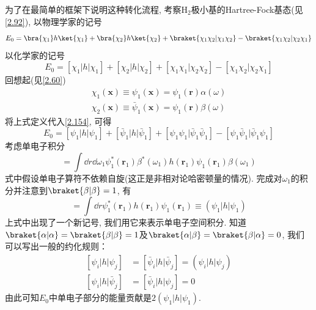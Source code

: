 为了在最简单的框架下说明这种转化流程, 
考察$\mathrm{H}_2$极小基的Hartree-Fock基态(见\autoref{2.92}), 
以物理学家的记号
\begin{equation}
E_0 = \bra{\chi_1}h\ket{\chi_1} + \bra{\chi_2}h\ket{\chi_2} + \braket{\chi_1\chi_2|\chi_1\chi_2} - \braket{\chi_1\chi_2|\chi_2\chi_1}
\end{equation}
以化学家的记号
\begin{equation}
\label{2.154}
E_0 = [{\chi_1|h|\chi_1}] + [{\chi_2|h|\chi_2}] + [{\chi_1\chi_1|\chi_2\chi_2}] - [{\chi_1\chi_2|\chi_2\chi_1}]
\end{equation}
回想起(见\autoref{2.60})
\begin{align}
\chi_1(\mathbf{x})\equiv \psi_1(\mathbf{x}) = \psi_1(\mathbf{\mathbf{r}})\alpha(\omega)\\
\chi_2(\mathbf{x})\equiv \bar{\psi}_1(\mathbf{x}) = \psi_1(\mathbf{\mathbf{r}})\beta(\omega)
\end{align}
将上式定义代入\autoref{2.154}, 
可得
\begin{equation}
\label{2.157}
E_0 = [{\psi_1|h|\psi_1}] + [{\bar{\psi}_1|h|\bar{\psi}_1}] + [{\psi_1\psi_1|\bar{\psi}_1\bar{\psi}_1}] - [{\psi_1\bar{\psi}_1|\bar{\psi}_1\psi_1}]
\end{equation}
考虑单电子积分
\begin{equation}
[\bar{\psi}_1|h|\bar{\psi}_1] = \int\dd{r}\dd\omega_1\psi_1^*(\mathbf{r}_1)\beta^*(\omega_1)h(\mathbf{r}_1)\psi_1(\mathbf{r}_1)\beta(\omega_1)
\end{equation}
式中假设单电子算符不依赖自旋(这正是非相对论哈密顿量的情况). 
完成对$\omega_1$的积分并注意到$\braket{\beta|\beta}=1$, 
有
\begin{equation}
[\bar{\psi}_1|h|\bar{\psi}_1] =\int\dd{r}\psi_1^*(\mathbf{r}_1)h(\mathbf{r}_1)\psi_1(\mathbf{r}_1) \equiv (\psi_1|h|\psi_1)
\end{equation}
上式中出现了一个新记号, 
我们用它来表示单电子空间积分. 
知道$\braket{\alpha|\alpha}=\braket{\beta|\beta}=1$及$\braket{\alpha|\beta}=\braket{\beta|\alpha}=0$, 
我们可以写出一般的约化规则：
\begin{align}
\label{2.160}
[{\psi}_i|h|{\psi}_j] & = [\bar{\psi}_i|h|\bar{\psi}_j] = (\psi_i|h|\psi_j)\\
[{\psi}_i|h|\bar{\psi}_j] & = [\bar{\psi}_i|h|\psi_j] = 0 
\label{2.161}
\end{align}
由此可知$E_0$中单电子部分的能量贡献是$2(\psi_1|h|\psi_1)$.



